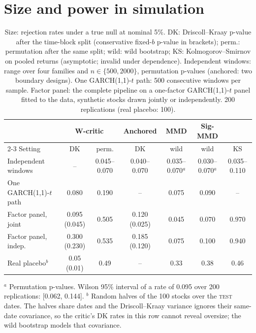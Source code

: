 \documentclass[11pt,a4paper]{article}
\theoremstyle{plain}
\newcommand{\TEST}{\textsc{test}}
\newcommand{\WC}{W-critic}
\newcommand{\GARCHt}{GARCH(1,1)-$t$}
\begin{document}
\section{Size and power in simulation}\label{sec:sim}

\begin{table}[t]
\centering
\caption{Size: rejection rates under a true null at nominal 5\%. DK: Driscoll--Kraay p-value after
  the time-block split (conservative fixed-$b$ p-value in brackets); perm.: permutation after the
  same split; wild: wild bootstrap; KS: Kolmogorov--Smirnov on pooled returns (asymptotic; invalid
  under dependence). Independent windows: range over four families and $n\in\{500,2000\}$,
  permutation p-values (anchored: two boundary designs). One \GARCHt{} path: 500 consecutive windows
  per sample. Factor panel: the complete pipeline on a one-factor \GARCHt{} panel fitted to the
  data, synthetic stocks drawn jointly or independently. 200 replications (real placebo: 100).}
\label{tab:size}
\footnotesize
\setlength{\tabcolsep}{4pt}
\begin{tabular}{@{}lcccccc@{}}
\toprule
 & \multicolumn{2}{c}{\WC{}} & Anchored & MMD & Sig-MMD & \\
\cmidrule(lr){2-3}
Setting & DK & perm. & DK & wild & wild & KS \\
\midrule
Independent windows & -- & 0.045--0.070 & 0.040--0.070 & 0.035--0.070$^a$ & 0.030--0.070$^a$ & 0.035--0.110 \\
One \GARCHt{} path & 0.080 & 0.190 & -- & 0.075 & 0.090 & -- \\
Factor panel, joint & 0.095 (0.045) & 0.505 & 0.120 (0.025) & 0.045 & 0.070 & 0.970 \\
Factor panel, indep. & 0.300 (0.230) & 0.535 & 0.185 (0.120) & 0.075 & 0.100 & 0.940 \\
Real placebo$^b$ & 0.05 (0.01) & 0.49 & -- & 0.33 & 0.38 & 0.46 \\
\bottomrule
\end{tabular}

\smallskip
\begin{minipage}{\linewidth}\footnotesize
$^a$ Permutation p-values. Wilson 95\% interval of a rate of 0.095 over 200 replications:
[0.062, 0.144].
$^b$ Random halves of the 100 stocks over the \TEST{} dates. The halves share dates and the
Driscoll--Kraay variance ignores their same-date covariance, so the critic's DK rates in this row
cannot reveal oversize; the wild bootstrap models that covariance.
\end{minipage}
\end{table}
\end{document}
